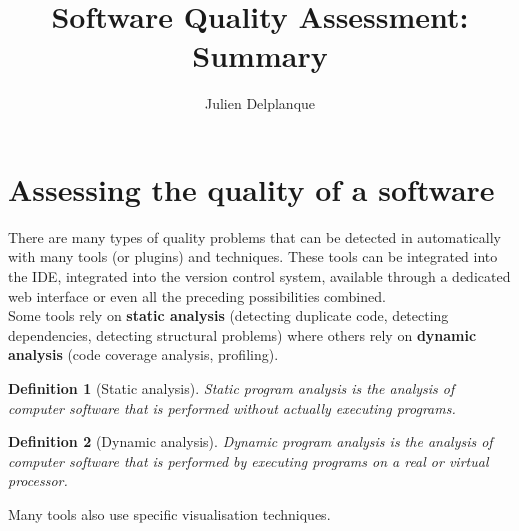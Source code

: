 \documentclass[a4paper,11pt]{report}
\title{Software Quality Assessment: Summary}
\author{Julien Delplanque}
\newtheorem{definition}{Definition}
\begin{document}
\maketitle
\newpage

\section{Assessing the quality of a software}
There are many types of quality problems that can be detected in automatically
with many tools (or plugins) and techniques. These tools can be integrated into
the IDE, integrated into the version control system, available through a
dedicated web interface or even all the preceding possibilities combined.\\

Some tools rely on \textbf{static analysis} (detecting duplicate code, detecting
dependencies, detecting structural problems) where others rely on
\textbf{dynamic analysis} (code coverage analysis, profiling).

\begin{definition}[Static analysis]
Static program analysis is the analysis of computer software that is performed
without actually executing programs.
\end{definition}

\begin{definition}[Dynamic analysis]
Dynamic program analysis is the analysis of computer software that is performed
by executing programs on a real or virtual processor.
\end{definition}

Many tools also use specific visualisation techniques.
\end{document}
